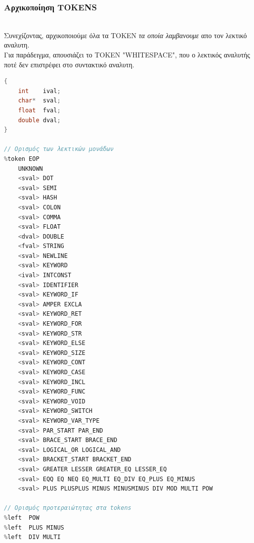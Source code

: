 \documentclass[14pt]{extarticle}
\begin{document}
\subsubsection{Αρχικοποίηση TOKENS}
\\
Συνεχίζοντας, αρχικοποιούμε όλα τα TOKEN \emph{τα οποία λαμβανουμε} απο τον λεκτικό
αναλυτη. 
\\
Για παράδειγμα, απουσιάζει το TOKEN "WHITESPACE", που ο λεκτικός αναλυτής ποτέ δεν επιστρέφει
στο συντακτικό αναλυτη.
\\
\begin{lstlisting}[language=C]
%union
{
    int    ival;
    char*  sval;
    float  fval;
    double dval;
}

// Ορισμός των λεκτικών μονάδων
%token EOP
    UNKNOWN
    <sval> DOT
    <sval> SEMI
    <sval> HASH
    <sval> COLON
    <sval> COMMA
    <sval> FLOAT
    <dval> DOUBLE
    <fval> STRING
    <sval> NEWLINE
    <sval> KEYWORD
    <ival> INTCONST
    <sval> IDENTIFIER
    <sval> KEYWORD_IF
    <sval> AMPER EXCLA
    <sval> KEYWORD_RET
    <sval> KEYWORD_FOR
    <sval> KEYWORD_STR
    <sval> KEYWORD_ELSE
    <sval> KEYWORD_SIZE
    <sval> KEYWORD_CONT
    <sval> KEYWORD_CASE
    <sval> KEYWORD_INCL
    <sval> KEYWORD_FUNC
    <sval> KEYWORD_VOID
    <sval> KEYWORD_SWITCH
    <sval> KEYWORD_VAR_TYPE
    <sval> PAR_START PAR_END
    <sval> BRACE_START BRACE_END
    <sval> LOGICAL_OR LOGICAL_AND
    <sval> BRACKET_START BRACKET_END
    <sval> GREATER LESSER GREATER_EQ LESSER_EQ
    <sval> EQQ EQ NEQ EQ_MULTI EQ_DIV EQ_PLUS EQ_MINUS
    <sval> PLUS PLUSPLUS MINUS MINUSMINUS DIV MOD MULTI POW

// Ορισμός προτεραιώτητας στα tokens
%left  POW
%left  PLUS MINUS
%left  DIV MULTI

\end{lstlisting}
\end{document}
